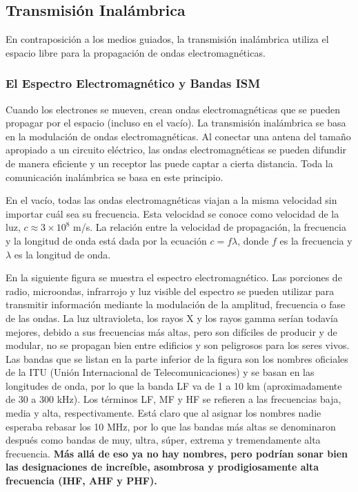 \subsection{Transmisión Inalámbrica}

En contraposición a los medios guiados, la transmisión inalámbrica utiliza el espacio libre para la propagación de ondas electromagnéticas.

\subsubsection{El Espectro Electromagnético y Bandas ISM}

Cuando los electrones se mueven, crean ondas electromagnéticas que se pueden propagar por el espacio (incluso en el vacío). La transmisión inalámbrica se basa en la modulación de ondas electromagnéticas. Al conectar una antena del tamaño apropiado a un circuito eléctrico, las ondas electromagnéticas se pueden difundir de manera eficiente y un receptor las puede captar a cierta distancia. Toda la comunicación inalámbrica se basa en este principio. 

En el vacío, todas las ondas electromagnéticas viajan a la misma velocidad sin importar cuál sea su frecuencia. Esta velocidad se conoce como velocidad de la luz, $c \approx 3 \times 10^8$ m/s. La relación entre la velocidad de propagación, la frecuencia y la longitud de onda está dada por la ecuación $c = f \lambda$, donde $f$ es la frecuencia y $\lambda$ es la longitud de onda.

En la siguiente figura se muestra el espectro electromagnético. Las porciones de radio, microondas, infrarrojo y luz visible del espectro se pueden utilizar para transmitir información mediante la modulación de la amplitud, frecuencia o fase de las ondas. La luz ultravioleta, los rayos X y los rayos gamma serían todavía mejores, debido a sus frecuencias más altas, pero son difíciles de producir y de modular, no se propagan bien entre edificios y son peligrosos para los seres vivos. Las bandas que se listan en la parte inferior de la figura son los nombres oficiales de la ITU (Unión Internacional de Telecomunicaciones) y se basan en las longitudes de onda, por lo que la banda LF va de 1 a 10 km (aproximadamente de 30 a 300 kHz). Los términos LF, MF y HF se refieren a las frecuencias baja, media y alta, respectivamente. Está claro que al asignar los nombres nadie esperaba rebasar los 10 MHz, por lo que las bandas más altas se denominaron después como bandas de muy, ultra, súper, extrema y tremendamente alta frecuencia. \textbf{Más allá de eso ya no hay nombres, pero podrían sonar bien las designaciones de increíble, asombrosa y prodigiosamente alta frecuencia (IHF, AHF y PHF).}

